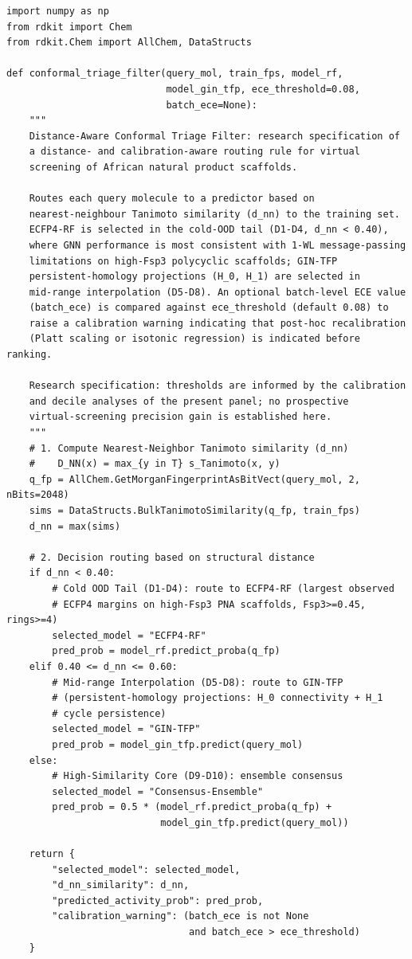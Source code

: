 \documentclass[11pt,a4paper]{article}
\begin{document}
\begin{lstlisting}
import numpy as np
from rdkit import Chem
from rdkit.Chem import AllChem, DataStructs

def conformal_triage_filter(query_mol, train_fps, model_rf,
                            model_gin_tfp, ece_threshold=0.08,
                            batch_ece=None):
    """
    Distance-Aware Conformal Triage Filter: research specification of
    a distance- and calibration-aware routing rule for virtual
    screening of African natural product scaffolds.

    Routes each query molecule to a predictor based on
    nearest-neighbour Tanimoto similarity (d_nn) to the training set.
    ECFP4-RF is selected in the cold-OOD tail (D1-D4, d_nn < 0.40),
    where GNN performance is most consistent with 1-WL message-passing
    limitations on high-Fsp3 polycyclic scaffolds; GIN-TFP
    persistent-homology projections (H_0, H_1) are selected in
    mid-range interpolation (D5-D8). An optional batch-level ECE value
    (batch_ece) is compared against ece_threshold (default 0.08) to
    raise a calibration warning indicating that post-hoc recalibration
    (Platt scaling or isotonic regression) is indicated before ranking.

    Research specification: thresholds are informed by the calibration
    and decile analyses of the present panel; no prospective
    virtual-screening precision gain is established here.
    """
    # 1. Compute Nearest-Neighbor Tanimoto similarity (d_nn)
    #    D_NN(x) = max_{y in T} s_Tanimoto(x, y)
    q_fp = AllChem.GetMorganFingerprintAsBitVect(query_mol, 2, nBits=2048)
    sims = DataStructs.BulkTanimotoSimilarity(q_fp, train_fps)
    d_nn = max(sims)

    # 2. Decision routing based on structural distance
    if d_nn < 0.40:
        # Cold OOD Tail (D1-D4): route to ECFP4-RF (largest observed
        # ECFP4 margins on high-Fsp3 PNA scaffolds, Fsp3>=0.45, rings>=4)
        selected_model = "ECFP4-RF"
        pred_prob = model_rf.predict_proba(q_fp)
    elif 0.40 <= d_nn <= 0.60:
        # Mid-range Interpolation (D5-D8): route to GIN-TFP
        # (persistent-homology projections: H_0 connectivity + H_1
        # cycle persistence)
        selected_model = "GIN-TFP"
        pred_prob = model_gin_tfp.predict(query_mol)
    else:
        # High-Similarity Core (D9-D10): ensemble consensus
        selected_model = "Consensus-Ensemble"
        pred_prob = 0.5 * (model_rf.predict_proba(q_fp) +
                           model_gin_tfp.predict(query_mol))

    return {
        "selected_model": selected_model,
        "d_nn_similarity": d_nn,
        "predicted_activity_prob": pred_prob,
        "calibration_warning": (batch_ece is not None
                                and batch_ece > ece_threshold)
    }
\end{lstlisting}
\end{document}
